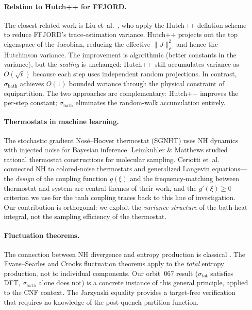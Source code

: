 \documentclass[11pt]{article}
\newcommand{\sbath}{\sigma_{\mathrm{bath}}}
\newcommand{\stot}{\sigma_{\mathrm{tot}}}
\begin{document}
\paragraph{Relation to Hutch++ for FFJORD.}
The closest related work is Liu et~al.\ \citep{liu2025hutch}, who apply the
Hutch++ deflation scheme to reduce FFJORD's trace-estimation variance. Hutch++
projects out the top eigenspace of the Jacobian, reducing the effective
$\|J\|_F^2$ and hence the Hutchinson variance. The improvement is algorithmic
(better constants in the variance), but the \emph{scaling} is unchanged:
Hutch++ still accumulates variance as $O(\sqrt{t})$ because each step uses
independent random projections. In contrast, $\sbath$ achieves $O(1)$ bounded
variance through the physical constraint of equipartition. The two approaches
are complementary: Hutch++ improves the per-step constant; $\sbath$ eliminates
the random-walk accumulation entirely.

\paragraph{Thermostats in machine learning.}
The stochastic gradient Nos\'{e}--Hoover thermostat (SGNHT)
\citep{ding2014bayesian} uses NH dynamics with injected noise for Bayesian
inference. Leimkuhler \& Matthews \citep{leimkuhler2013rational} studied
rational thermostat constructions for molecular sampling. Ceriotti et~al.\
\citep{ceriotti2010colored} connected NH to colored-noise thermostats and
generalized Langevin equations---the \emph{design} of the coupling function
$g(\xi)$ and the frequency-matching between thermostat and system are central
themes of their work, and the $g'(\xi) \geq 0$ criterion we use for the tanh
coupling traces back to this line of investigation. Our contribution is
orthogonal: we exploit the \emph{variance structure} of the bath-heat integral,
not the sampling efficiency of the thermostat.

\paragraph{Fluctuation theorems.}
The connection between NH divergence and entropy production is classical
\citep{evans2002fluctuation, gallavotti1995dynamical}. The Evans--Searles and
Crooks fluctuation theorems apply to the \emph{total} entropy production, not
to individual components. Our orbit~067 result ($\stot$ satisfies DFT, $\sbath$
alone does not) is a concrete instance of this general principle, applied to
the CNF context. The Jarzynski equality \citep{jarzynski1997nonequilibrium}
provides a target-free verification that requires no knowledge of the
post-quench partition function.
\end{document}
